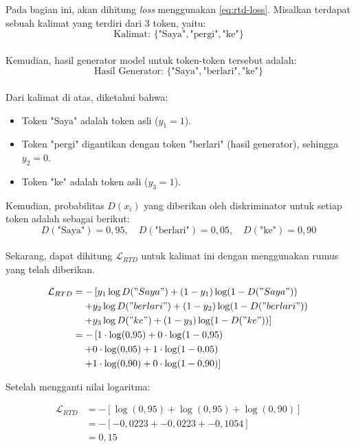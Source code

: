 Pada bagian ini, akan dihitung \textit{loss} menggunakan \ref{eq:rtd-loss}. 
Misalkan terdapat sebuah kalimat yang terdiri dari 3 token, yaitu:
\\ 
\[
\text{Kalimat: } \{ \text{"Saya"}, \text{"pergi"}, \text{"ke"} \}
\]
\\

Kemudian, hasil generator model untuk token-token tersebut adalah:
\\
\[
\text{Hasil Generator: } \{ \text{"Saya"}, \text{"berlari"}, \text{"ke"} \}
\]
\\
Dari kalimat di atas, diketahui bahwa:
\begin{itemize}[noitemsep]
    \item Token "Saya" adalah token asli (\(y_1 = 1\)).
    \item Token "pergi" digantikan dengan token "berlari" (hasil generator), sehingga \(y_2 = 0\).
    \item Token "ke" adalah token asli (\(y_3 = 1\)).
\end{itemize}

Kemudian, probabilitas \(D(x_i)\) yang diberikan oleh diskriminator untuk setiap token adalah sebagai berikut:
\\
\[
D(\text{"Saya"}) = 0{,}95, \quad D(\text{"berlari"}) = 0{,}05, \quad D(\text{"ke"}) = 0{,}90
\]
\\
Sekarang, dapat dihitung \(\mathcal{L}_{RTD}\) untuk kalimat ini dengan menggunakan rumus yang telah diberikan.

\begin{align*}
    \mathcal{L}_{RTD} &= - \left[ y_1 \log D("Saya") + (1 - y_1) \log (1 - D("Saya")) \right. \\
    &\quad \left. + y_2 \log D("berlari") + (1 - y_2) \log (1 - D("berlari")) \right. \\
    &\quad \left. + y_3 \log D("ke") + (1 - y_3) \log (1 - D("ke")) \right] \\
    &= - \left[ 1 \cdot \log(0{,}95) + 0 \cdot \log(1 - 0{,}95) \right. \\
    &\quad \left. + 0 \cdot \log(0{,}05) + 1 \cdot \log(1 - 0{,}05) \right. \\
    &\quad \left. + 1 \cdot \log(0{,}90) + 0 \cdot \log(1 - 0{,}90) \right]\\
\end{align*}

Setelah mengganti nilai logaritma:

\begin{align*}
    \mathcal{L}_{RTD} &= - \left[ \log(0{,}95) + \log(0{,}95) + \log(0{,}90) \right] \\
    &= - \left[ -0{,}0223 + -0{,}0223 + -0{,}1054 \right] \\
    &= 0{,}15 \\
\end{align*}

